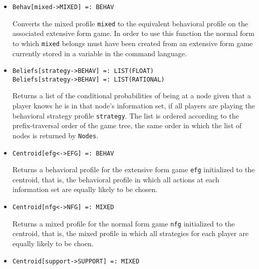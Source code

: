 \begin{itemize}

\item
\protect \large \begin{verbatim}
Behav[mixed->MIXED] =: BEHAV
\end{verbatim}\normalsize

\bd
Converts the mixed profile \verb+mixed+ to the equivalent
behavioral profile on the associated extensive form game.  In order to use
this function the normal form to which \verb+mixed+ belongs must have
been created from an extensive form game currently stored in a variable
in the command language.
\ed

\item
\protect \large \begin{verbatim}
Beliefs[strategy->BEHAV] =: LIST(FLOAT)
Beliefs[strategy->BEHAV] =: LIST(RATIONAL)
\end{verbatim}\normalsize

\bd
Returns a list of the conditional probabilities of
being at a node given that a player knows he is in that node's information
set, if all players are playing the behavioral strategy profile
\verb+strategy+.  The list is ordered according to the prefix-traversal
order of the game tree, the same order in which the list of nodes is
returned by {\tt Nodes}.
\ed



\item
\protect \large \begin{verbatim} 
Centroid[efg<->EFG] =: BEHAV
\end{verbatim}\normalsize

\bd
Returns a behavioral profile for the extensive form
game \verb+efg+ initialized to the centroid, that is, the behavioral
profile in which all actions at each information set are equally
likely to be chosen.
\ed

\item
\protect \large \begin{verbatim}
Centroid[nfg<->NFG] =: MIXED
\end{verbatim}\normalsize

\bd
Returns a mixed profile for the normal form game \verb+nfg+
initialized to the centroid, that is, the mixed profile in which all
strategies for each player are equally likely to be choen.
\ed

\item
\protect \large \begin{verbatim}
Centroid[support->SUPPORT] =: MIXED
\end{verbatim}\normalsize


\end{itemize}
